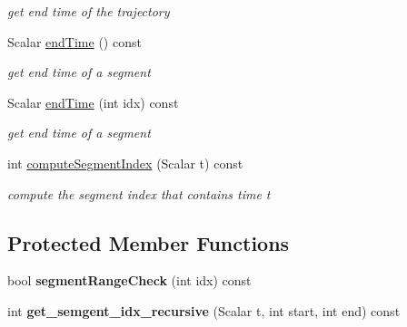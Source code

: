 \begin{DoxyCompactItemize}
\begin{DoxyCompactList}\small\item\em get end time of the trajectory \end{DoxyCompactList}\item 
Scalar \hyperlink{classow__core_1_1PiecewiseTrajectoryBase_a032dfc78353088e7f31f6974e9a776d6}{end\+Time} () const \hypertarget{classow__core_1_1PiecewiseTrajectoryBase_a032dfc78353088e7f31f6974e9a776d6}{}\label{classow__core_1_1PiecewiseTrajectoryBase_a032dfc78353088e7f31f6974e9a776d6}

\begin{DoxyCompactList}\small\item\em get end time of a segment \end{DoxyCompactList}\item 
Scalar \hyperlink{classow__core_1_1PiecewiseTrajectoryBase_a640bbf51b466c649957c91acdc211d0b}{end\+Time} (int idx) const \hypertarget{classow__core_1_1PiecewiseTrajectoryBase_a640bbf51b466c649957c91acdc211d0b}{}\label{classow__core_1_1PiecewiseTrajectoryBase_a640bbf51b466c649957c91acdc211d0b}

\begin{DoxyCompactList}\small\item\em get end time of a segment \end{DoxyCompactList}\item 
int \hyperlink{classow__core_1_1PiecewiseTrajectoryBase_a9572de2c48da29f8d221bb2aa7940d5f}{compute\+Segment\+Index} (Scalar t) const \hypertarget{classow__core_1_1PiecewiseTrajectoryBase_a9572de2c48da29f8d221bb2aa7940d5f}{}\label{classow__core_1_1PiecewiseTrajectoryBase_a9572de2c48da29f8d221bb2aa7940d5f}

\begin{DoxyCompactList}\small\item\em compute the segment index that contains time t \end{DoxyCompactList}\end{DoxyCompactItemize}
\subsection*{Protected Member Functions}
\begin{DoxyCompactItemize}
\item 
bool {\bfseries segment\+Range\+Check} (int idx) const \hypertarget{classow__core_1_1PiecewiseTrajectoryBase_a2149a1711233ec38c54d4ef2666607f5}{}\label{classow__core_1_1PiecewiseTrajectoryBase_a2149a1711233ec38c54d4ef2666607f5}

\item 
int {\bfseries get\+\_\+semgent\+\_\+idx\+\_\+recursive} (Scalar t, int start, int end) const \hypertarget{classow__core_1_1PiecewiseTrajectoryBase_a2d30dd558d6090babdb8625bb57ad1de}{}\label{classow__core_1_1PiecewiseTrajectoryBase_a2d30dd558d6090babdb8625bb57ad1de}

\end{DoxyCompactItemize}
